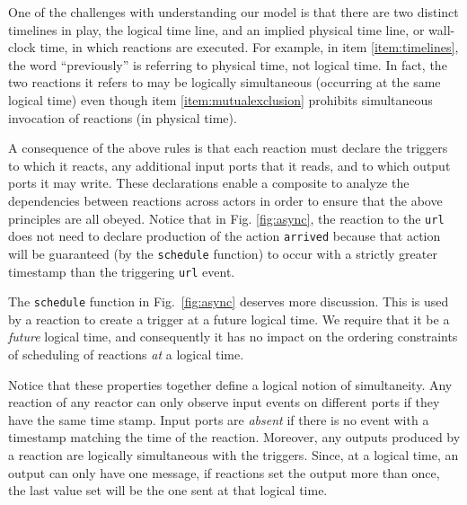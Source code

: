 \documentclass[sigconf]{acmart}
\begin{document}
One of the challenges with understanding our model is that there are two distinct timelines in play,
the logical time line, and an implied physical time line, or wall-clock time, in which reactions are executed.
For example, in item \ref{item:timelines}, the word ``previously'' is referring to physical time, not logical time.
In fact, the two reactions it refers to may be logically simultaneous (occurring at the same logical time)
even though item \ref{item:mutualexclusion} prohibits simultaneous invocation of reactions (in physical time).

A consequence of the above rules is that each reaction must declare the triggers to which
it reacts, any additional input ports that it reads, and to which output ports it may write.
These declarations enable a composite to analyze the dependencies between reactions across actors
in order to ensure that the above principles are all obeyed.
Notice that in Fig. \ref{fig:async}, the reaction to the \texttt{url} does not need to declare production
of the action \texttt{arrived} because that action will be guaranteed (by the \texttt{schedule} function) to
occur with a strictly greater timestamp than the triggering \texttt{url} event.

The \texttt{schedule} function in Fig.~\ref{fig:async} deserves more discussion.
This is used by a reaction to create a trigger at a future logical time.
We require that it be a \emph{future} logical time, and consequently it has no impact on
the ordering constraints of scheduling of reactions \emph{at} a logical time.

Notice that these properties together define a logical notion of simultaneity.
Any reaction of any reactor can only observe input events on different ports if they have the same time stamp.
Input ports are \emph{absent} if there is no event with a timestamp matching the time of the reaction.
Moreover, any outputs produced by a reaction are logically simultaneous with the triggers.
Since, at a logical time, an output can only have one message, if reactions set the output more than once,
the last value set will be the one sent at that logical time.
\end{document}
